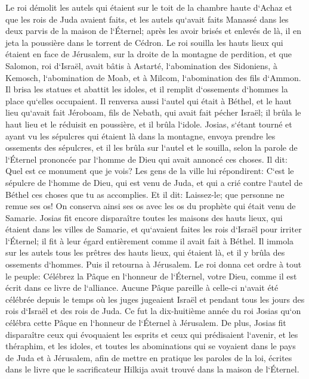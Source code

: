 \verse Le roi démolit les autels qui étaient sur le toit de la chambre haute d`Achaz et que les rois de Juda avaient faits, et les autels qu`avait faits Manassé dans les deux parvis de la maison de l`Éternel; après les avoir brisés et enlevés de là, il en jeta la poussière dans le torrent de Cédron. 
\verse Le roi souilla les hauts lieux qui étaient en face de Jérusalem, sur la droite de la montagne de perdition, et que Salomon, roi d`Israël, avait bâtis à Astarté, l`abomination des Sidoniens, à Kemosch, l`abomination de Moab, et à Milcom, l`abomination des fils d`Ammon. 
\verse Il brisa les statues et abattit les idoles, et il remplit d`ossements d`hommes la place qu`elles occupaient. 
\verse Il renversa aussi l`autel qui était à Béthel, et le haut lieu qu`avait fait Jéroboam, fils de Nebath, qui avait fait pécher Israël; il brûla le haut lieu et le réduisit en poussière, et il brûla l`idole. 
\verse Josias, s`étant tourné et ayant vu les sépulcres qui étaient là dans la montagne, envoya prendre les ossements des sépulcres, et il les brûla sur l`autel et le souilla, selon la parole de l`Éternel prononcée par l`homme de Dieu qui avait annoncé ces choses. 
\verse Il dit: Quel est ce monument que je vois? Les gens de la ville lui répondirent: C`est le sépulcre de l`homme de Dieu, qui est venu de Juda, et qui a crié contre l`autel de Béthel ces choses que tu as accomplies. 
\verse Et il dit: Laissez-le; que personne ne remue ses os! On conserva ainsi ses os avec les os du prophète qui était venu de Samarie. 
\verse Josias fit encore disparaître toutes les maisons des hauts lieux, qui étaient dans les villes de Samarie, et qu`avaient faites les rois d`Israël pour irriter l`Éternel; il fit à leur égard entièrement comme il avait fait à Béthel. 
\verse Il immola sur les autels tous les prêtres des hauts lieux, qui étaient là, et il y brûla des ossements d`hommes. Puis il retourna à Jérusalem. 
\verse Le roi donna cet ordre à tout le peuple: Célébrez la Pâque en l`honneur de l`Éternel, votre Dieu, comme il est écrit dans ce livre de l`alliance. 
\verse Aucune Pâque pareille à celle-ci n`avait été célébrée depuis le temps où les juges jugeaient Israël et pendant tous les jours des rois d`Israël et des rois de Juda. 
\verse Ce fut la dix-huitième année du roi Josias qu`on célébra cette Pâque en l`honneur de l`Éternel à Jérusalem. 
\verse De plus, Josias fit disparaître ceux qui évoquaient les esprits et ceux qui prédisaient l`avenir, et les théraphim, et les idoles, et toutes les abominations qui se voyaient dans le pays de Juda et à Jérusalem, afin de mettre en pratique les paroles de la loi, écrites dans le livre que le sacrificateur Hilkija avait trouvé dans la maison de l`Éternel. 
